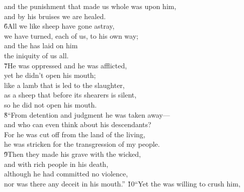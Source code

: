 \begin{poetry}
\poeml and the punishment that made us whole was upon him, \\
\poemll    and by his bruises we are healed. \\
\poeml \v{6}All we like sheep have gone astray, \\
\poemll    we have turned, each of us, to his own way; \\
\poeml and the  has laid on him \\
\poemll    the iniquity of us all. \\
\poeml \v{7}He was oppressed and he was afflicted, \\
\poemll    yet he didn't open his mouth; \\
\poeml like a lamb that is led to the slaughter, \\
\poemll    as a sheep that before its shearers is silent, \\
\poemlll       so he did not open his mouth. \\
\poeml \v{8}``From detention and judgment he was taken away--- \\
\poemll    and who can even think about his descendants? \\
\poeml For he was cut off from the land of the living, \\
\poemll    he was stricken for the transgression of my people. \\
\poeml \v{9}Then they made his grave with the wicked, \\
\poemll    and with rich people in his death, \\
\poeml although he had committed no violence, \\
\poemll    nor was there any deceit in his mouth.''
\poeml \v{10}``Yet the  was willing to crush him, \\

\end{poetry}

